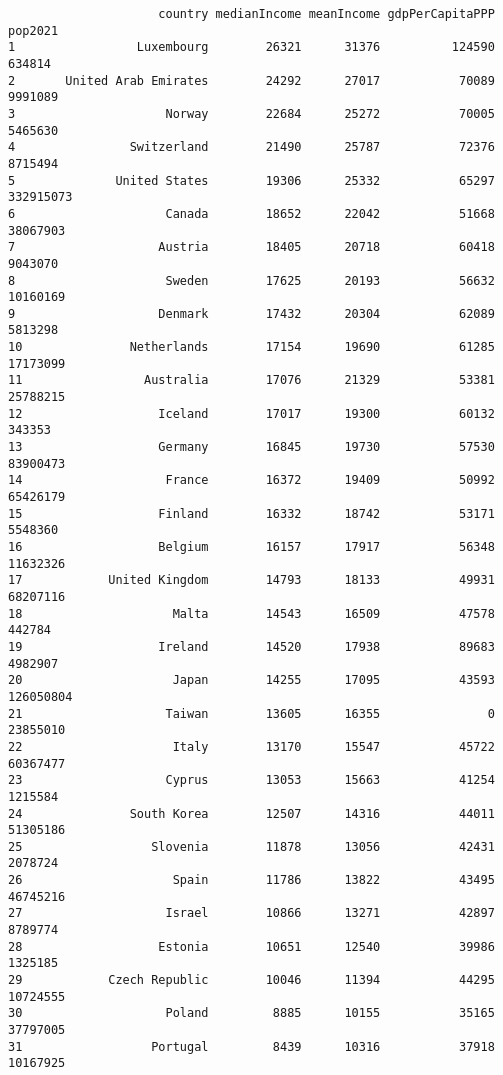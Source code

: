 \documentclass[
]{article}
\begin{document}
\begin{verbatim}
                     country medianIncome meanIncome gdpPerCapitaPPP    pop2021
1                 Luxembourg        26321      31376          124590     634814
2       United Arab Emirates        24292      27017           70089    9991089
3                     Norway        22684      25272           70005    5465630
4                Switzerland        21490      25787           72376    8715494
5              United States        19306      25332           65297  332915073
6                     Canada        18652      22042           51668   38067903
7                    Austria        18405      20718           60418    9043070
8                     Sweden        17625      20193           56632   10160169
9                    Denmark        17432      20304           62089    5813298
10               Netherlands        17154      19690           61285   17173099
11                 Australia        17076      21329           53381   25788215
12                   Iceland        17017      19300           60132     343353
13                   Germany        16845      19730           57530   83900473
14                    France        16372      19409           50992   65426179
15                   Finland        16332      18742           53171    5548360
16                   Belgium        16157      17917           56348   11632326
17            United Kingdom        14793      18133           49931   68207116
18                     Malta        14543      16509           47578     442784
19                   Ireland        14520      17938           89683    4982907
20                     Japan        14255      17095           43593  126050804
21                    Taiwan        13605      16355               0   23855010
22                     Italy        13170      15547           45722   60367477
23                    Cyprus        13053      15663           41254    1215584
24               South Korea        12507      14316           44011   51305186
25                  Slovenia        11878      13056           42431    2078724
26                     Spain        11786      13822           43495   46745216
27                    Israel        10866      13271           42897    8789774
28                   Estonia        10651      12540           39986    1325185
29            Czech Republic        10046      11394           44295   10724555
30                    Poland         8885      10155           35165   37797005
31                  Portugal         8439      10316           37918   10167925

\end{verbatim}
\end{document}
